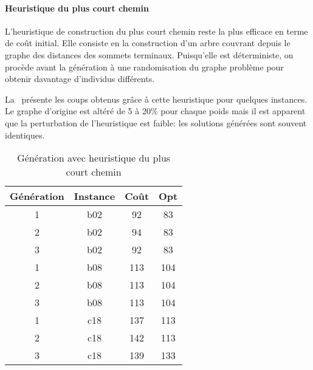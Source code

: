 \documentclass[10pt]{article}
\begin{document}
		\paragraph{Heuristique du plus court chemin}{
			L'heuristique de construction du plus court chemin reste la plus efficace en terme de coût initial. Elle consiste en la construction d'un arbre couvrant depuis le graphe des distances des sommets terminaux. Puisqu'elle est déterministe, on procède avant la génération à une randomisation du graphe problème pour obtenir davantage d'individus différents.
		
		La~ présente les coups obtenus grâce à cette heuristique pour quelques instances. Le graphe d'origine est altéré de 5 à 20\% pour chaque poids mais il est apparent que la perturbation de l'heuristique est faible: les solutions générées sont souvent identiques.
		
		\begin{table}[h!]
				\centering
				\begin{tabular}{|c|c|c|c|}
					\hline
					\textbf{Génération} & \textbf{Instance} & \textbf{Coût} & \textbf{Opt} \\
					\hline
					1 & b02  & 92 & 83 \\
					2 & b02  & 94 & 83 \\
					3 & b02  & 92 & 83 \\
					1 & b08  & 113 & 104 \\
					2 & b08  & 113 & 104 \\
					3 & b08  & 113 & 104 \\
					1 & c18  & 137 & 113 \\
					2 & c18  & 142 & 113 \\
					3 & c18  & 139 & 133 \\
					\hline
				\end{tabular}
				\caption{Génération avec heuristique du plus court chemin}
				\label{tab-spinit}
			\end{table}
		}
\end{document}
